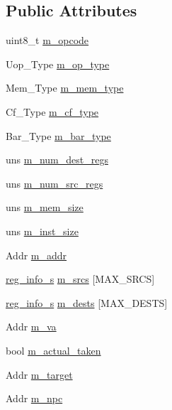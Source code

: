 \subsection*{Public Attributes}
\begin{DoxyCompactItemize}
\item 
uint8\_\-t \hyperlink{structtrace__uop__s_af4dcf3db0186150544c87b255e3db33d}{m\_\-opcode}
\item 
Uop\_\-Type \hyperlink{structtrace__uop__s_af40966b23eb6a1a52c585cff32b1e22b}{m\_\-op\_\-type}
\item 
Mem\_\-Type \hyperlink{structtrace__uop__s_a7aec327b761f6617dddf0674cca0e4f6}{m\_\-mem\_\-type}
\item 
Cf\_\-Type \hyperlink{structtrace__uop__s_a2914ddcaa6787d93914de16edfd7369a}{m\_\-cf\_\-type}
\item 
Bar\_\-Type \hyperlink{structtrace__uop__s_adb4072e10f06644f837979021c37b4ed}{m\_\-bar\_\-type}
\item 
uns \hyperlink{structtrace__uop__s_a2f05dce7998347a9d31e248e95e6ca3b}{m\_\-num\_\-dest\_\-regs}
\item 
uns \hyperlink{structtrace__uop__s_adb68dace5de092c07e737faa420aee35}{m\_\-num\_\-src\_\-regs}
\item 
uns \hyperlink{structtrace__uop__s_a75b4e8be6cc570f920a2a7fbb3046244}{m\_\-mem\_\-size}
\item 
uns \hyperlink{structtrace__uop__s_a6a3c82bbf6153fbee7bc8dd1bf4552c7}{m\_\-inst\_\-size}
\item 
Addr \hyperlink{structtrace__uop__s_a969a71bd1a66780652ccafa1dc8899ad}{m\_\-addr}
\item 
\hyperlink{structreg__info__s}{reg\_\-info\_\-s} \hyperlink{structtrace__uop__s_ac5ebcda38121f83dc3c809d4d8e0389f}{m\_\-srcs} \mbox{[}MAX\_\-SRCS\mbox{]}
\item 
\hyperlink{structreg__info__s}{reg\_\-info\_\-s} \hyperlink{structtrace__uop__s_acb7781a9850d511660ef11154c4963b9}{m\_\-dests} \mbox{[}MAX\_\-DESTS\mbox{]}
\item 
Addr \hyperlink{structtrace__uop__s_afb7847a5a6cd06570e44563c44891c69}{m\_\-va}
\item 
bool \hyperlink{structtrace__uop__s_a3b49bbce85cc478fde2b890513e7998b}{m\_\-actual\_\-taken}
\item 
Addr \hyperlink{structtrace__uop__s_ac2f3700ad5a2adde36180f5cf943a096}{m\_\-target}
\item 
Addr \hyperlink{structtrace__uop__s_a78f6fffd9b111782913748b7541fc966}{m\_\-npc}
\item 

\end{DoxyCompactItemize}

